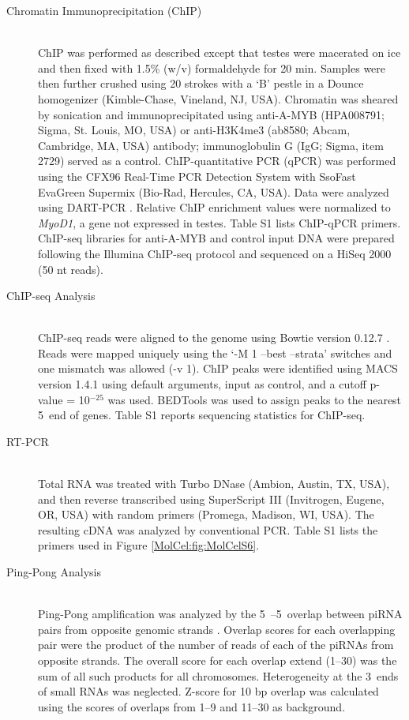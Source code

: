 \begin{description}
    \item[Chromatin Immunoprecipitation (ChIP)] \hfill \\
    ChIP was performed as described \citep{Chen2008} except that testes were macerated on ice and then fixed with 1.5\% (w/v) formaldehyde for 20 min. Samples were then further crushed using 20 strokes with a ‘B’ pestle in a Dounce homogenizer (Kimble-Chase, Vineland, NJ, USA). Chromatin was sheared by sonication and immunoprecipitated using anti-A-MYB (HPA008791; Sigma, St. Louis, MO, USA) or anti-H3K4me3 (ab8580; Abcam, Cambridge, MA, USA) antibody; immunoglobulin G (IgG; Sigma, item 2729) served as a control. ChIP-quantitative PCR (qPCR) was performed using the CFX96 Real-Time PCR Detection System with SsoFast EvaGreen Supermix (Bio-Rad, Hercules, CA, USA). Data were analyzed using DART-PCR \citep{Peirson2003}. Relative ChIP enrichment values were normalized to \textit{MyoD1}, a gene not expressed in testes. Table S1 lists ChIP-qPCR primers. ChIP-seq libraries for anti-A-MYB and control input DNA were prepared following the Illumina ChIP-seq protocol and sequenced on a HiSeq 2000 (50 nt reads).

    \item[ChIP-seq Analysis] \hfill \\
    ChIP-seq reads were aligned to the genome using Bowtie version 0.12.7 \citep{Langmead2009}. Reads were mapped uniquely using the ‘-M 1 --best --strata’ switches and one mismatch was allowed (-v 1). ChIP peaks were identified using MACS version 1.4.1 \citep{Zhang2008} using default arguments, input as control, and a cutoff p-value = 10$^{-25}$ was used. BEDTools was used to assign peaks to the nearest 5\textprime~end of genes. Table S1 reports sequencing statistics for ChIP-seq.

    \item[RT-PCR] \hfill \\
    Total RNA was treated with Turbo DNase (Ambion, Austin, TX, USA), and then reverse transcribed using SuperScript III (Invitrogen, Eugene, OR, USA) with random primers (Promega, Madison, WI, USA). The resulting cDNA was analyzed by conventional PCR. Table S1 lists the primers used in Figure \ref{MolCel:fig:MolCelS6}.

    \item[Ping-Pong Analysis] \hfill \\
    Ping-Pong amplification was analyzed by the 5\textprime~–5\textprime~overlap between piRNA pairs from opposite genomic strands \citep{Li2009a}. Overlap scores for each overlapping pair were the product of the number of reads of each of the piRNAs from opposite strands. The overall score for each overlap extend (1–30) was the sum of all such products for all chromosomes. Heterogeneity at the 3\textprime~ends of small RNAs was neglected. Z-score for 10 bp overlap was calculated using the scores of overlaps from 1–9 and 11–30 as background.


\end{description}
